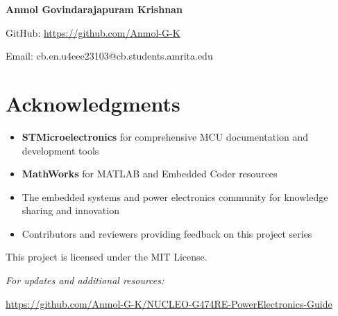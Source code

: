 \textbf{Anmol Govindarajapuram Krishnan}

GitHub: \url{https://github.com/Anmol-G-K}

Email: cb.en.u4eee23103@cb.students.amrita.edu

\section*{Acknowledgments}

\begin{itemize}
    \item \textbf{STMicroelectronics} for comprehensive MCU
          documentation and development tools
    \item \textbf{MathWorks} for MATLAB and Embedded Coder resources
    \item The embedded systems and power electronics community
          for knowledge sharing and innovation
    \item Contributors and reviewers providing feedback on
          this project series
\end{itemize}

This project is licensed under the MIT License.

\vspace{1cm}

\noindent\textit{For updates and additional resources:}

\noindent\url{https://github.com/Anmol-G-K/NUCLEO-G474RE-PowerElectronics-Guide}

